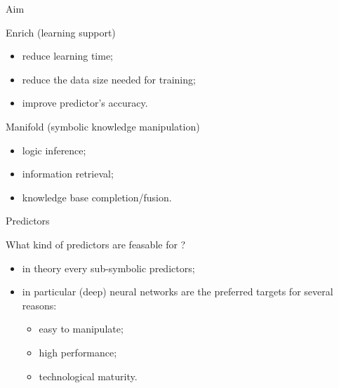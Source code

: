 \documentclass[presentation]{beamer}\mode<presentation>{\usetheme{AMSBolognaFC}}
\begin{document}
\begin{frame}[c]{Aim}
    \begin{block}{Enrich (learning support)}
        \begin{itemize}
            \item reduce learning time;
            \item reduce the data size needed for training;
            \item improve predictor's accuracy.
        \end{itemize}
    \end{block}
    \begin{block}{Manifold (symbolic knowledge manipulation)}
    \begin{itemize}
        \item logic inference;
        \item information retrieval;
        \item knowledge base completion/fusion.
    \end{itemize}
    \end{block}
\end{frame}

\begin{frame}[c]{Predictors}
    \begin{block}{What kind of predictors are feasable for \ski?}
        \begin{itemize}
            \item in theory every sub-symbolic predictors;
            \item in particular (deep) neural networks are the preferred targets for several reasons:
            \begin{itemize}
                \item easy to manipulate;
                \item high performance;
                \item technological maturity.
            \end{itemize}
        \end{itemize}
    \end{block}
\end{frame}
\end{document}

